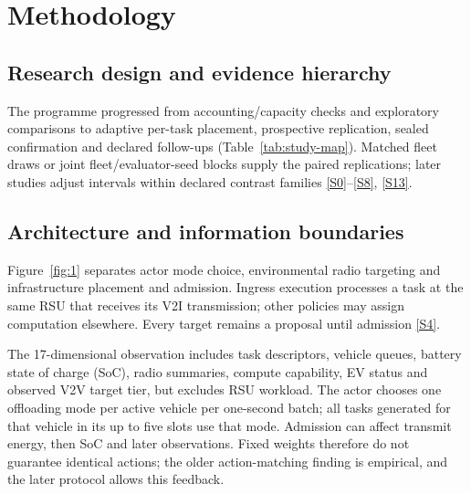 \documentclass[12pt,a4paper]{article}
\begin{document}
\FloatBarrier
\section{Methodology}\label{sec:2}

\FloatBarrier
\subsection{Research design and evidence hierarchy}\label{sec:2.1}

The programme progressed from accounting/capacity checks and exploratory comparisons to adaptive per-task placement, prospective replication, sealed confirmation and declared follow-ups (Table~\ref{tab:study-map}). Matched fleet draws or joint fleet/evaluator-seed blocks supply the paired replications; later studies adjust intervals within declared contrast families \hyperref[source-s0]{[S0]}--\hyperref[source-s8]{[S8]}, \hyperref[source-s13]{[S13]}.



\FloatBarrier
\subsection{Architecture and information boundaries}\label{sec:2.2}

Figure~\ref{fig:1} separates actor mode choice, environmental radio targeting and infrastructure placement and admission. Ingress execution processes a task at the same RSU that receives its V2I transmission; other policies may assign computation elsewhere. Every target remains a proposal until admission \hyperref[source-s4]{[S4]}.

The 17-dimensional observation includes task descriptors, vehicle queues, battery state of charge (SoC), radio summaries, compute capability, EV status and observed V2V target tier, but excludes RSU workload. The actor chooses one offloading mode per active vehicle per one-second batch; all tasks generated for that vehicle in its up to five slots use that mode. Admission can affect transmit energy, then SoC and later observations. Fixed weights therefore do not guarantee identical actions; the older action-matching finding is empirical, and the later protocol allows this feedback.
\end{document}
